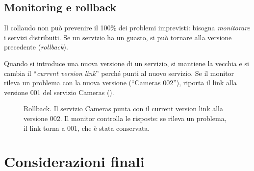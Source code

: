 \subsection{Monitoring e rollback}

Il collaudo non può prevenire il 100\% dei problemi imprevisti: bisogna \emph{monitorare} i servizi distribuiti. Se un
servizio ha un guasto, si può tornare alla versione precedente (\emph{rollback}).

\begin{esempio}
Quando si introduce una nuova versione di un servizio, si mantiene la vecchia e si cambia il ``\emph{current version
link}'' perché punti al nuovo servizio. Se il monitor rileva un problema con la nuova versione (``Cameras 002''), riporta
il link alla versione 001 del servizio Cameras ().
\end{esempio}

\begin{figure}[ht]
\centering
{}
\caption{Rollback. Il servizio Cameras punta con il current version link alla versione 002. Il monitor controlla le
risposte: se rileva un problema, il link torna a 001, che è stata conservata.}
\label{fig:micro-rollback}
\end{figure}

\section{Considerazioni finali}
\label{sec:micro-conclusioni}

